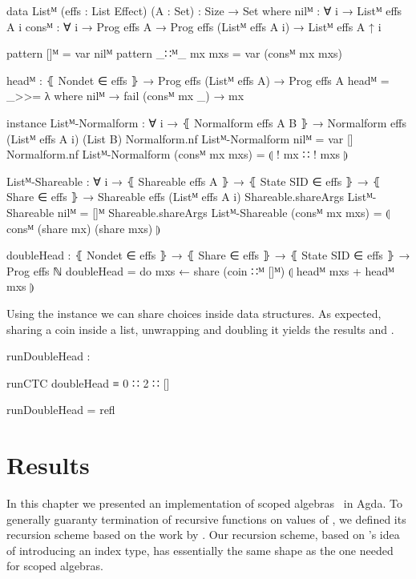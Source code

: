 \begin{code}[hide]
data Listᴹ (effs : List Effect) (A : Set) : {Size} → Set where
  nilᴹ  : ∀ {i} → Listᴹ effs A {i}
  consᴹ : ∀ {i} → Prog effs A → Prog effs (Listᴹ effs A {i}) → Listᴹ effs A {↑ i}

pattern []ᴹ         = var nilᴹ
pattern _∷ᴹ_ mx mxs = var (consᴹ mx mxs)

headᴹ : ⦃ Nondet ∈ effs ⦄ → Prog effs (Listᴹ effs A) → Prog effs A
headᴹ = _>>= λ where
  nilᴹ         → fail
  (consᴹ mx _) → mx

instance
  Listᴹ-Normalform : ∀ {i} → ⦃ Normalform effs A B ⦄ → Normalform effs (Listᴹ effs A {i}) (List B)
  Normalform.nf Listᴹ-Normalform nilᴹ           = var []
  Normalform.nf Listᴹ-Normalform (consᴹ mx mxs) = ⦇ ! mx ∷ ! mxs ⦈

  Listᴹ-Shareable : ∀ {i} → ⦃ Shareable effs A ⦄ → ⦃ State SID ∈ effs ⦄ → ⦃ Share ∈ effs ⦄ → Shareable effs (Listᴹ effs A {i})
  Shareable.shareArgs Listᴹ-Shareable nilᴹ           = []ᴹ
  Shareable.shareArgs Listᴹ-Shareable (consᴹ mx mxs) = ⦇ consᴹ (share mx) (share mxs) ⦈
\end{code}
\begin{code}
doubleHead : ⦃ Nondet ∈ effs ⦄ → ⦃ Share ∈ effs ⦄ → ⦃ State SID ∈ effs ⦄ →
  Prog effs ℕ
doubleHead = do mxs ← share (coin ∷ᴹ []ᴹ)
                ⦇ headᴹ mxs + headᴹ mxs ⦈
\end{code}
Using the  instance we can share choices inside data
structures.
As expected, sharing a coin inside a list, unwrapping and doubling it yields the
results  and .

\begin{center}
\begin{code}
runDoubleHead :
\end{code}
\begin{code}[inline]
 runCTC doubleHead ≡ 0 ∷ 2 ∷ []
\end{code}
\begin{code}
runDoubleHead = refl
\end{code}
\end{center}


\section{Results}

In this chapter we presented an implementation of scoped
algebras~\cite{DBLP:conf/lics/PirogSWJ18} in Agda.
To generally guaranty termination of recursive functions on values of
, we defined its recursion scheme based on the work by
\textcite{DBLP:journals/corr/abs-1806-05230}.
Our recursion scheme, based on \textcite{DBLP:journals/corr/abs-1806-05230}'s idea
of introducing an index type, has essentially the same shape as the one needed
for scoped algebras.

